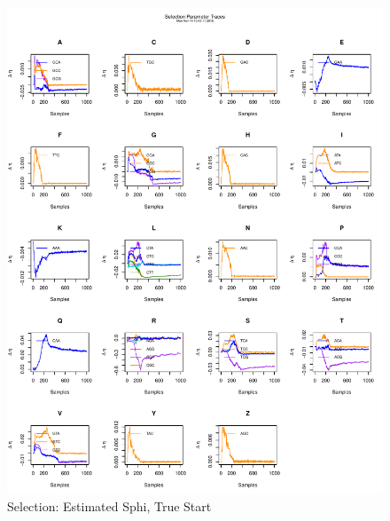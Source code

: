 \documentclass[11pt]{labbook}
\begin{document}
    \begin{figure}
        \centering
        \includegraphics[scale=.65]{FONSE_Plots/2016/November_9/estSphi_sim_sel}
        \caption{Selection: Estimated Sphi, True Start}
        \label{fig:NOV9_E.S.SEL}
    \end{figure}
    
\end{document}
